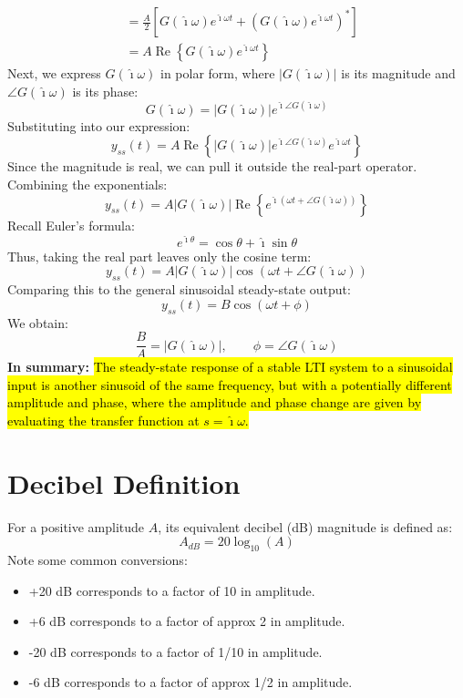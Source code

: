 ﻿\documentclass[12pt]{article}
\begin{document}
\begin{tcolorbox}[breakable, colback=white, colframe=black]
\[\begin{aligned}
&=\frac{A}{2}\left[G(\hat{\imath}\omega)e^{\hat{\imath}\omega t}+\left(G(\hat{\imath}\omega)e^{\hat{\imath}\omega t}\right)^*\right]\\
&=A\operatorname{Re}\left\{G(\hat{\imath}\omega)e^{\hat{\imath}\omega t}\right\}
\end{aligned}\]
Next, we express $G(\hat{\imath}\omega)$ in polar form, where $|G(\hat{\imath}\omega)|$ is its magnitude and $\angle G(\hat{\imath}\omega)$ is its phase:
\[G(\hat{\imath}\omega)=|G(\hat{\imath}\omega)|e^{\hat{\imath}\angle G(\hat{\imath}\omega)}\]
Substituting into our expression:
\[y_{ss}(t)=A\operatorname{Re}\left\{|G(\hat{\imath}\omega)|e^{\hat{\imath}\angle G(\hat{\imath}\omega)}e^{\hat{\imath}\omega t}\right\}\]
Since the magnitude is real, we can pull it outside the real-part operator. Combining the exponentials:
\[y_{ss}(t)=A|G(\hat{\imath}\omega)|\operatorname{Re}\left\{e^{\hat{\imath}(\omega t+\angle G(\hat{\imath}\omega))}\right\}\]
Recall Euler's formula:
\[e^{\hat{\imath}\theta}=\cos\theta+\hat{\imath}\sin\theta\]
Thus, taking the real part leaves only the cosine term:
\[\boxed{y_{ss}(t)=A|G(\hat{\imath}\omega)|\cos(\omega t+\angle G(\hat{\imath}\omega))}\]
Comparing this to the general sinusoidal steady-state output:
\[y_{ss}(t)=B\cos(\omega t+\phi)\]
We obtain:
\[\boxed{\frac{B}{A}=|G(\hat{\imath}\omega)|,\qquad \phi=\angle G(\hat{\imath}\omega)}\]
\textbf{In summary:} \hl{The steady-state response of a stable LTI system to a sinusoidal input is another sinusoid of the same frequency, but with a potentially different amplitude and phase, where the amplitude and phase change are given by evaluating the transfer function at $s = \hat{\imath}\omega$.}
\end{tcolorbox}
\section*{Decibel Definition}
For a positive amplitude $A$, its equivalent decibel (dB) magnitude is defined as:
\[\boxed{A_{dB} = 20 \log_{10}(A)}\]
Note some common conversions:
\begin{itemize}
    \item +20 dB corresponds to a factor of 10 in amplitude.
    \item +6 dB corresponds to a factor of approx 2 in amplitude.
    \item -20 dB corresponds to a factor of 1/10 in amplitude.
    \item -6 dB corresponds to a factor of approx 1/2 in amplitude.
\end{itemize}
\end{document}
